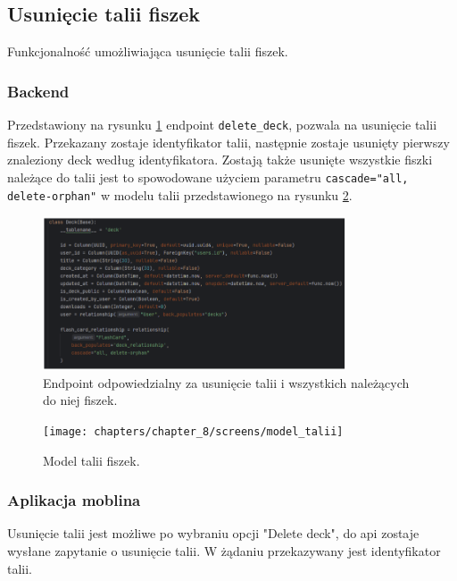 \subsection{Usunięcie talii fiszek}

Funkcjonalność umożliwiająca usunięcie talii fiszek.

\subsubsection{Backend}

Przedstawiony na rysunku \ref{img:delete_deck_backend} endpoint \texttt{delete\_deck}, pozwala na usunięcie talii fiszek. Przekazany zostaje identyfikator talii, następnie zostaje usunięty pierwszy znaleziony deck według identyfikatora. Zostają także usunięte wszystkie fiszki należące do talii jest to spowodowane użyciem parametru \texttt{cascade="all, delete-orphan"} w modelu talii przedstawionego na rysunku \ref{img:model_talii}.


\begin{figure}[H]
    \centering
    \includegraphics[width=0.8\textwidth]{chapters/chapter_8/screens/delete_deck_backend}
    \caption{Endpoint odpowiedzialny za usunięcie talii i wszystkich należących do niej fiszek.}
    \label{img:delete_deck_backend}
\end{figure}

\begin{figure}[H]
    \centering
    \texttt{[image: chapters/chapter\_8/screens/model\_talii]}
    \caption{Model talii fiszek.}
    \label{img:model_talii}
\end{figure}


\subsubsection{Aplikacja moblina}
Usunięcie talii jest możliwe po wybraniu opcji "Delete deck", do api zostaje wysłane zapytanie o usunięcie talii. W żądaniu przekazywany jest identyfikator talii.


